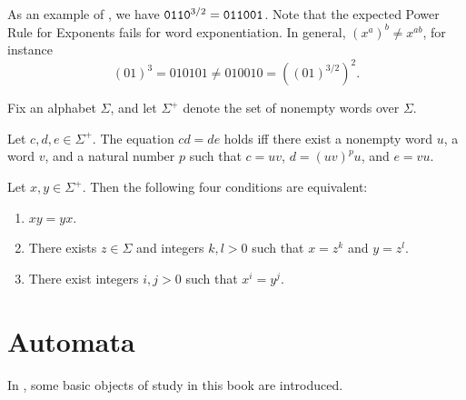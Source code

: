 		As an example of , we have $\mathtt{0110}^{3/2}=\mathtt{011001}$.
		Note that the expected Power Rule for Exponents fails for word exponentiation.
		In general, $(x^a)^b\ne x^{ab}$, for instance
		\[
			(01)^3=010101\ne 010010= ((01)^{3/2})^2.
		\]

		Fix an alphabet $\Sigma$, and let $\Sigma^+$ denote the set of nonempty words over $\Sigma$.

		\begin{lemma}\label{shallit232}\label{thm:lyndon}
			Let $c,d,e\in\Sigma^+$.
			The equation $cd=de$ holds iff there exist a nonempty word $u$,
			a word $v$, and a natural number $p$ such that
			$c=uv$,
			$d=(uv)^p u$, and
			$e=vu$.
		\end{lemma}

		\begin{theorem}\label{thm:shallit233}\label{lyndon:schuetzenberger}
			Let $x,y\in\Sigma^+$. Then the following four conditions are equivalent:
			\begin{enumerate}
				\item\label{t:1} $xy=yx$.
				\item\label{t:2} There exists $z\in\Sigma$ and integers $k,l>0$ such that $x=z^k$ and $y=z^l$.
				\item\label{t:3} There exist integers $i,j>0$ such that $x^i=y^j$.
			\end{enumerate}
		\end{theorem}


	\section{Automata}
		In , some basic objects of study in this book are introduced.

